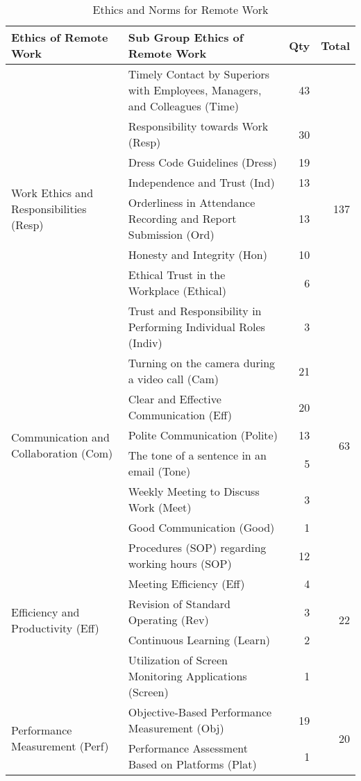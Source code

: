 \documentclass{infotel}
\begin{document}
\renewcommand{\arraystretch}{1.3}
\begin{table*}[ht]
	\centering
	\caption{Ethics and Norms for Remote Work}
	\label{tab:ethics_for_remote_work}
	\begin{tabular}{p{} p{} r r}
		\hline
		\textbf{Ethics of Remote Work} & \textbf{Sub Group Ethics of Remote Work} & \textbf{Qty} & \textbf{Total} \\ 
		\hline
		\multirow{8}{=}{Work Ethics and Responsibilities (Resp)}   
		& Timely Contact by Superiors with Employees, Managers, and Colleagues (Time) & 43 & \multirow{8}{*}{137} \\ 
		& Responsibility towards Work (Resp) & 30 & \\ 
		& Dress Code Guidelines (Dress) & 19 & \\ 
		& Independence and Trust (Ind) & 13 & \\ 
		& Orderliness in Attendance Recording and Report Submission (Ord) & 13 & \\ 
		& Honesty and Integrity (Hon) & 10 & \\ 
		& Ethical Trust in the Workplace (Ethical) & 6 & \\ 
		& Trust and Responsibility in Performing Individual Roles (Indiv) & 3 & \\ 
		\hline
		
		\multirow{6}{=}{Communication and Collaboration (Com)}    
		& Turning on the camera during a video call (Cam) & 21 & \multirow{6}{*}{63} \\ 
		& Clear and Effective Communication (Eff) & 20 & \\ 
		& Polite Communication (Polite) & 13 & \\ 
		& The tone of a sentence in an email (Tone) & 5 & \\ 
		& Weekly Meeting to Discuss Work (Meet) & 3 & \\ 
		& Good Communication (Good) & 1 & \\ 
		\hline
		
		\multirow{5}{=}{Efficiency and Productivity (Eff)}    
		& Procedures (SOP) regarding working hours (SOP) & 12 & \multirow{5}{*}{22} \\ 
		& Meeting Efficiency (Eff) & 4 & \\ 
		& Revision of Standard Operating (Rev) & 3 & \\ 
		& Continuous Learning (Learn) & 2 & \\ 
		& Utilization of Screen Monitoring Applications (Screen) & 1 & \\ 
		\hline
		
		\multirow{2}{=}{Performance Measurement (Perf)} 
		& Objective-Based Performance Measurement (Obj) & 19 & \multirow{2}{*}{20} \\ 
		& Performance Assessment Based on Platforms (Plat) & 1 & \\ 
		\hline
	\end{tabular}
\end{table*}
\end{document}
